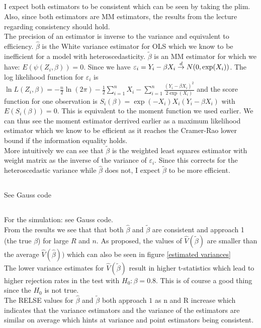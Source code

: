 \documentclass[11pt]{article}
\theoremstyle{break}
\begin{document}
\subsection{}
I expect both estimators to be consistent which can be seen by taking the plim. Also, since both estimators are MM estimators, the results from the lecture regarding consistency should hold. \\
The precision of an estimator is inverse to the variance and equivalent to efficiency. $\hat{\beta}$ is the White variance estimator for OLS which we know to be inefficient for a model with heteroscedasticity. $\tilde{\beta}$ is an MM estimator for which we have: $E(\psi(Z_i, \beta)) = 0$. Since we have $\varepsilon_i = Y_i - \beta X_i \;{\buildrel d \over \rightarrow}\; N(0, \exp(X_i))$. The log likelihood function for $\varepsilon_i$ is $\ln L(Z_i, \beta) = -\frac{n}{2}\ln(2\pi) - \frac{1}{2}\displaystyle\sum_{i=1}^n X_i - \displaystyle \sum_{i=1}^n \frac{(Y_i - \beta X_i)^2}{2\exp(X_i)}$ and the score function for one observation is $S_i(\beta) = \exp(-X_i)X_i(Y_i-\beta X_i)$ with $E(S_i(\beta)) = 0$. This is equivalent to the moment function we used earlier. We can thus see the moment estimator derrived earlier as a maximum likelihood estimator which we know to be efficient as it reaches the Cramer-Rao lower bound if the information equality holds. \\
More intuitively we can see that $\tilde{\beta}$ is the weighted least squares estimator with weight matrix as the inverse of the variance of $\varepsilon_i$. Since this corrects for the heteroscedastic variance while $\hat{\beta}$ does not, I expect $\tilde{\beta}$ to be more efficient.

\subsection{}
See Gauss code

\subsection{}
For the simulation: see Gauss code. \\
From the results we see that that both $\hat{\beta}$ and $\tilde{\beta}$ are consistent and approach 1 (the true $\beta$) for large $R$ and $n$. As proposed, the values of $\hat{V}(\tilde{\beta})$ are smaller than the average $\hat{V}(\hat{\beta}))$ which can also be seen in figure \ref{estimated variances} \\
The lower variance estimates for $\hat{V}(\tilde{\beta})$ result in higher t-statistics which lead to higher rejection rates in the test with $H_0:\beta=0.8$. This is of course a good thing since the $H_0$ is not true. \\
The RELSE values for $\hat{\beta}$ and $\tilde{\beta}$ both approach $1$ as n and R increase which indicates that the variance estimators and the variance of the estimators are similar on average which hints at variance and point estimators being consistent.
\end{document}
